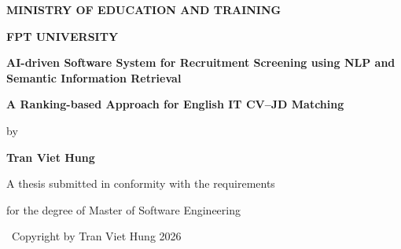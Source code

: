 \documentclass[12pt,a4paper,oneside]{report}
\newcommand{\thesistitle}{AI-driven Software System for Recruitment Screening using NLP and Semantic Information Retrieval}
\newcommand{\thesissubtitle}{A Ranking-based Approach for English IT CV--JD Matching}
\begin{document}
\hypersetup{pageanchor=false}
\begin{titlepage}
\thispagestyle{empty}
\centering
\vspace*{0.5cm}
{\bfseries\large MINISTRY OF EDUCATION AND TRAINING\par}
\vspace{0.35cm}
{\bfseries\large FPT UNIVERSITY\par}

\vspace{3.1cm}
{\bfseries\LARGE \thesistitle\par}
\vspace{0.55cm}
{\bfseries\Large \thesissubtitle\par}

\vspace{1.35cm}
{\large by\par}
\vspace{0.45cm}
{\bfseries\large Tran Viet Hung\par}

\vspace{1.3cm}
{\large A thesis submitted in conformity with the requirements\par}
\vspace{0.35cm}
{\large for the degree of Master of Software Engineering\par}

\vfill
{\large \textcopyright\ Copyright by Tran Viet Hung 2026\par}
\end{titlepage}
\end{document}
